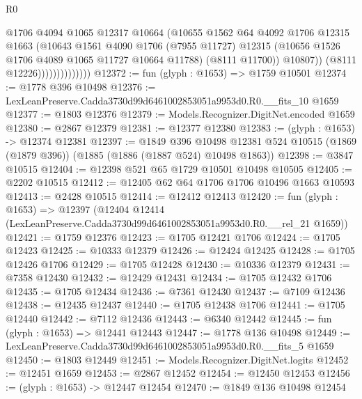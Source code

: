\begin{lexlean}{R0}
\begin{coremodule}
                                @1706
                                @4094
                                @1065
                                @12317
                                @10664
                                (@10655
                                  @1562
                                  @64
                                  @4092
                                  @1706
                                  @12315
                                  @1663
                                  (@10643
                                    @1561
                                    @4090
                                    @1706
                                    (@7955 @11727)
                                    @12315
                                    (@10656 @1526 @1706 @4089 @1065 @11727 @10664 @11788)
                                    (@8111 @11700))
                                  @10807))
                              (@8111 @12226))))))))))))))
@12372 := fun (glyph : @1653) => @1759 @10501
@12374 := @1778 @396 @10498
@12376 := LexLeanPreserve.Cadda3730d99d6461002853051a9953d0.R0.__fits_10 @1659
@12377 := @1803 @12376
@12379 := Models.Recognizer.DigitNet.encoded @1659
@12380 := @2867 @12379
@12381 := @12377 @12380
@12383 := (glyph : @1653) -> @12374 @12381
@12397 := @1849
    @396
    @10498
    @12381
    @524
    @10515
    (@1869 (@1879 @396))
    (@1885 (@1886 (@1887 @524) @10498 @1863))
@12398 := @3847 @10515
@12404 := @12398 @521 @65 @1729 @10501 @10498 @10505
@12405 := @2202 @10515
@12412 := @12405 @62 @64 @1706 @1706 @10496 @1663 @10593
@12413 := @2428 @10515
@12414 := @12412 @12413
@12420 := fun (glyph : @1653) =>
  @12397 (@12404 @12414 (LexLeanPreserve.Cadda3730d99d6461002853051a9953d0.R0.__rel_21 @1659))
@12421 := @1759 @12376
@12423 := @1705 @12421 @1706
@12424 := @1705 @12423
@12425 := @10333 @12379
@12426 := @12424 @12425
@12428 := @1705 @12426 @1706
@12429 := @1705 @12428
@12430 := @10336 @12379
@12431 := @7358 @12430
@12432 := @12429 @12431
@12434 := @1705 @12432 @1706
@12435 := @1705 @12434
@12436 := @7361 @12430
@12437 := @7109 @12436
@12438 := @12435 @12437
@12440 := @1705 @12438 @1706
@12441 := @1705 @12440
@12442 := @7112 @12436
@12443 := @6340 @12442
@12445 := fun (glyph : @1653) => @12441 @12443
@12447 := @1778 @136 @10498
@12449 := LexLeanPreserve.Cadda3730d99d6461002853051a9953d0.R0.__fits_5 @1659
@12450 := @1803 @12449
@12451 := Models.Recognizer.DigitNet.logits
@12452 := @12451 @1659
@12453 := @2867 @12452
@12454 := @12450 @12453
@12456 := (glyph : @1653) -> @12447 @12454
@12470 := @1849
    @136
    @10498
    @12454

\end{coremodule}
\end{lexlean}
